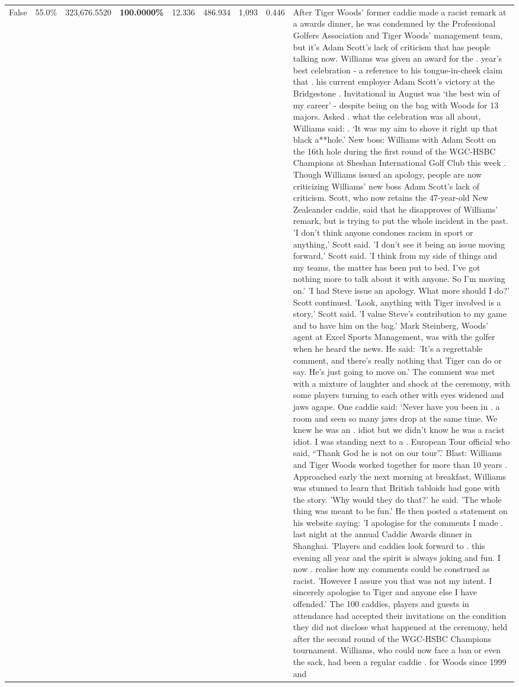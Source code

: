 \begin{table}[H]
\begin{tabular}{lllrlllll}
False & 55.0\% & 323,676.5520 & \bfseries \color{red} 100.0000\% & 12.336 & 486.934 & 1,093 & 0.446 & After Tiger Woods' former caddie made a racist remark at a awards dinner, he was condemned by the Professional Golfers Association and Tiger Woods' management team, but it's Adam Scott's lack of criticism that has people talking now. Williams was given an award for the . year’s best celebration - a reference to his tongue-in-cheek claim that . his current employer Adam Scott’s victory at the Bridgestone . Invitational in August was ‘the best win of my career’ - despite being on the bag with Woods for 13 majors. Asked . what the celebration was all about, Williams said: . ‘It was my aim to shove it right up that black a**hole.’ New boss: Williams with Adam Scott  on the 16th hole during the first round of the WGC-HSBC Champions at Sheshan International Golf Club this week . Though Williams issued an apology, people are now criticizing Williams' new boss Adam Scott's lack of criticism. Scott, who now retains the 47-year-old New Zealeander caddie, said that he disapproves of Williams' remark, but is trying to put the whole incident in the past. 'I don't think anyone condones racism in sport or anything,' Scott said. 'I don't see it being an issue moving forward,' Scott said. 'I think from my side of things and my teams, the matter has been put to bed. I've got nothing more to talk about it with anyone. So I'm moving on.' 'I had Steve issue an apology. What more should I do?' Scott continued. 'Look, anything with Tiger involved is a story,' Scott said. 'I value Steve's contribution to my game and to have him on the bag.' Mark Steinberg, Woods' agent at Excel Sports Management, was with the golfer when he heard the news. He said: 'It's a regrettable comment, and there's really nothing that Tiger can do or say. He's just going to move on.' The comment was met with a mixture of laughter and shock at the ceremony, with some players turning to each other with eyes widened and jaws agape. One caddie said: ‘Never have you been in . a room and seen so many jaws drop at the same time. We knew he was an . idiot but we didn’t know he was a racist idiot. I was standing next to a . European Tour official who said, “Thank God he is not on our tour”.’ Blast: Williams and Tiger Woods worked together for more than 10 years . Approached early the next morning at breakfast, Williams was stunned to learn that British tabloids had gone with the story. 'Why would they do that?' he said. 'The whole thing was meant to be fun.' He then posted a statement on his website saying: 'I apologise for the comments I made . last night at the annual Caddie Awards dinner in Shanghai. 'Players and caddies look forward to . this evening all year and the spirit is always joking and fun. I now . realise how my comments could be construed as racist. 'However I assure you that was not my intent. I sincerely apologise to Tiger and anyone else I have offended.' The 100 caddies, players and guests in attendance had accepted their invitations on the condition they did not disclose what happened at the ceremony, held after the second round of the WGC-HSBC Champions tournament. Williams, who could now face a ban or even the sack, had been a regular caddie . for Woods since 1999 and 
\end{tabular}
\end{table}
